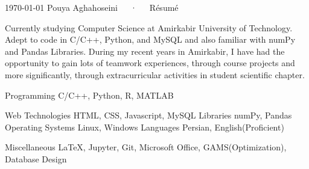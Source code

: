 \documentclass[11pt, a4paper]{awesome-cv}
\begin{document}
\makecvheader[C]

\makecvfooter
  {\today}
  {Pouya Aghahoseini~~~·~~~Résumé}
  {\thepage}


\begin{cvparagraph}
	
	Currently studying Computer Science at Amirkabir University of Technology. Adept to code in C/C++, Python, and MySQL and also familiar with numPy and Pandas Libraries.
	During my recent years in Amirkabir, I have had the opportunity to gain lots of teamwork experiences, through course projects and more significantly, through extracurricular activities in student scientific chapter.
	
\end{cvparagraph}


\begin{cvskills}
	\cvskill
	{Programming} %
	{C/C++, Python, R, MATLAB} %
	
	\cvskill
	{Web Technologies} %
	{HTML, CSS, Javascript, MySQL} %
	\cvskill
	{Libraries} %
	{numPy, Pandas} %
	\cvskill
	{Operating Systems} %
	{Linux, Windows}
	\cvskill
	{Languages} %
	{Persian, English(Proficient)}	
	
	\cvskill
	{Miscellaneous}
	{\LaTeX, Jupyter, Git, Microsoft Office, GAMS(Optimization), Database Design}%
	
\end{cvskills}
\end{document}
